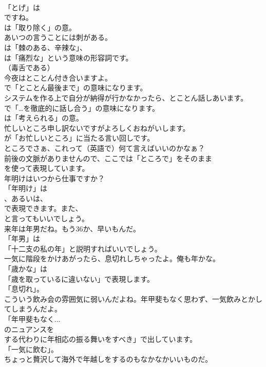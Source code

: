 \documentclass[8pt]{extreport}
\begin{document}
\begin{CJK}{UTF8}{min}
\\	「とげ」は
\\	ですね。
\\	は「取り除く」の意。	
\\	あいつの言うことには刺がある。 
\\	は「棘のある、辛辣な」、
\\	は「痛烈な」という意味の形容詞です。
\\	（毒舌である）	
\\	今夜はとことん付き合いますよ。 
\\	で「とことん最後まで」の意味になります。	
\\	システムを作る上で自分が納得が行かなかったら、とことん話しあいます。 
\\	で「…を徹底的に話し合う」の意味になります。
\\	は「考えられる」の意。	
\\	忙しいところ申し訳ないですがよろしくおねがいします。 
\\	が「お忙しいところ」に当たる言い回しです。	
\\	ところでさぁ、これって（英語で）何て言えばいいのかなぁ？ 
\\	前後の文脈がありませんので、ここでは「ところで」をそのまま
\\	を使って表現しています。	
\\	年明けはいつから仕事ですか？ 
\\	「年明け」は
\\	、あるいは、
\\	で表現できます。また、
\\	と言ってもいいでしょう。	
\\	来年は年男だね。もう36か、早いもんだ。 
\\	「年男」は
\\	「十二支の私の年」と説明すればいいでしょう。	
\\	一気に階段をかけあがったら、息切れしちゃったよ。俺も年かな。 
\\	「歳かな」は
\\	「歳を取っているに違いない」で表現します。
\\	「息切れ」。	
\\	こういう飲み会の雰囲気に弱いんだよね。年甲斐もなく思わず、一気飲みとかしてしまうんだよ。 
\\	「年甲斐もなく... 
\\	のニュアンスを
\\	する代わりに年相応の振る舞いをすべき」で出しています。
\\	「一気に飲む」。	
\\	ちょっと贅沢して海外で年越しをするのもなかなかいいものだ。 

\end{CJK}
\end{document}
